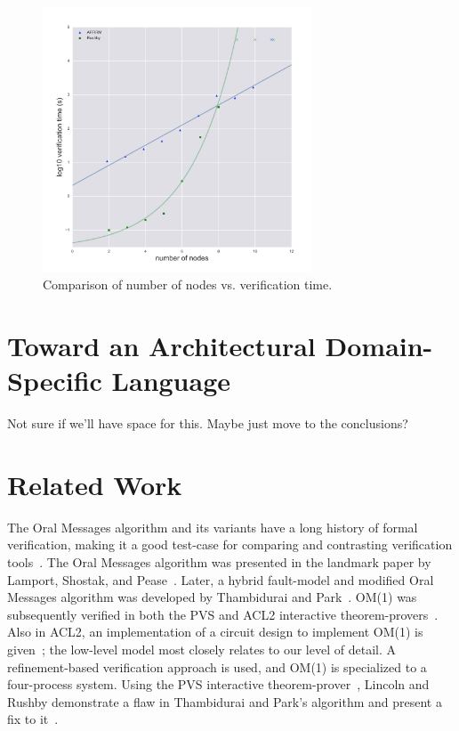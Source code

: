 \documentclass{llncs/llncs}
\begin{document}
\begin{figure}
  \centering
  \includegraphics[width=8cm]{figs/benchmark}
  \caption{Comparison of number of nodes vs. verification time.}
  \label{fig:compare}
\end{figure}

\section{Toward an Architectural Domain-Specific Language}\label{sec:adsl}
Not sure if we'll have space for this. Maybe just move to the conclusions?

\section{Related Work}\label{sec:related}

The Oral Messages algorithm and its variants have a long history of formal verification, making it a good test-case for comparing and contrasting verification tools~\cite{pvs}. The Oral Messages algorithm was presented in the landmark paper by Lamport, Shostak, and Pease~\cite{om}. Later, a hybrid fault-model and modified Oral Messages algorithm was developed by Thambidurai and Park~\cite{hybrid}. OM(1) was subsequently verified in both the PVS and ACL2 interactive theorem-provers~\cite{Young97:IC}. Also in ACL2, an implementation of a circuit design to implement OM(1) is given~\cite{om-acl2-impl}; the low-level model most closely relates to our level of detail. A refinement-based verification approach is used, and OM(1) is specialized to a four-process system. Using the PVS interactive theorem-prover~\cite{pvs}, Lincoln and Rushby demonstrate a flaw in Thambidurai and Park's algorithm and present a fix to it~\cite{csl-93-2}.
\end{document}
